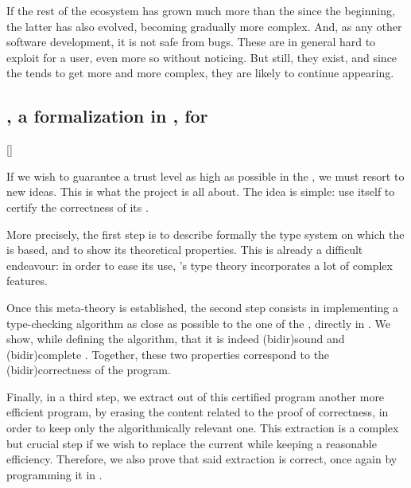 If the rest of the ecosystem has grown much more than the  since the beginning,
the latter has also evolved, becoming gradually more complex.
And, as any other software development, it is not safe from bugs.%
These are in general hard to exploit for a user, even more so without noticing.
But still, they exist, and since the  tends to get more and more complex, they
are likely to continue appearing.

\subsection{, a formalization in , for }[]
\label{sec:intro-metacoq-fr}

If we wish to guarantee a trust level as high as possible in the , we must
resort to new ideas. This is what the  project is all about. The idea
is simple: use  itself to certify the correctness of its .

More precisely, the first step is to describe formally the type system on which the 
is based, and to show its theoretical properties.
This is already a difficult endeavour: in order to ease its use, ’s type theory
incorporates a lot of complex features.

Once this meta-theory is established, the second step
consists in implementing a type-checking algorithm as close as possible to the one of the
, directly in %
.
We show, while defining the algorithm, that it is indeed \reintro(bidir){sound}%
and \reintro(bidir){complete}%
.
Together, these two properties correspond to the \intro(bidir){correctness} of
the program.

Finally, in a third step, we extract out of this certified  program another
more efficient program, by erasing the content related to the proof of correctness, in order
to keep only the algorithmically relevant one.
This extraction is a complex but crucial step if we wish to replace the current 
while keeping a reasonable efficiency. Therefore, we also prove that said extraction
is correct,%
once again by programming it in .

